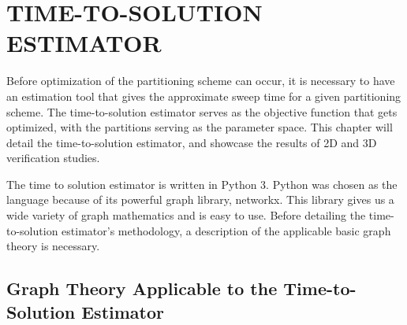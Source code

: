 %
%
%
%
 \setcounter{MaxMatrixCols}{30}
\newcommand{\tcr}[1]{\textcolor{red}{#1}}


\chapter{TIME-TO-SOLUTION ESTIMATOR \label{cha:tts}}

Before optimization of the partitioning scheme can occur, it is necessary to have an estimation tool that gives the approximate sweep time for a given partitioning scheme. The time-to-solution estimator serves as the objective function that gets optimized, with the partitions serving as the parameter space. This chapter will detail the time-to-solution estimator, and showcase the results of 2D and 3D verification studies. 

The time to solution estimator is written in Python 3. Python was chosen as the language because of its powerful graph library, networkx. 
This library gives us a wide variety of graph mathematics and is easy to use. 
Before detailing the time-to-solution estimator's methodology, a description of the applicable basic graph theory is necessary. 

\section{Graph Theory Applicable to the Time-to-Solution Estimator}

